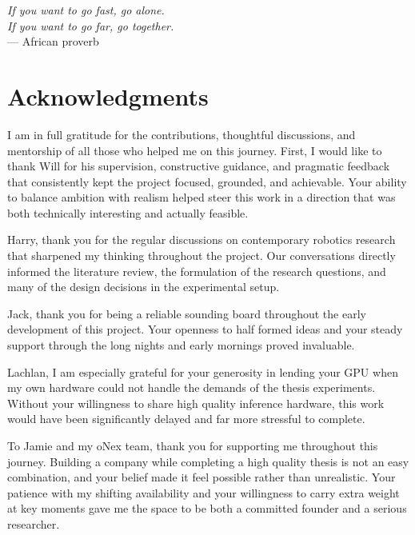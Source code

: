 
\begin{flushright}{\slshape    
    If you want to go fast, go alone. \\
    If you want to go far, go together.} \\ \medskip
    --- African proverb
\end{flushright}

\bigskip

\begingroup
\let\clearpage\relax
\let\cleardoublepage\relax
\chapter*{Acknowledgments}

I am in full gratitude for the contributions, thoughtful discussions, and mentorship of all those who helped me on this journey. First, I would like to thank Will for his supervision, constructive guidance, and pragmatic feedback that consistently kept the project focused, grounded, and achievable. Your ability to balance ambition with realism helped steer this work in a direction that was both technically interesting and actually feasible.

Harry, thank you for the regular discussions on contemporary robotics research that sharpened my thinking throughout the project. Our conversations directly informed the literature review, the formulation of the research questions, and many of the design decisions in the experimental setup.

Jack, thank you for being a reliable sounding board throughout the early development of this project. Your openness to half formed ideas and your steady support through the long nights and early mornings proved invaluable.

Lachlan, I am especially grateful for your generosity in lending your GPU when my own hardware could not handle the demands of the thesis experiments. Without your willingness to share high quality inference hardware, this work would have been significantly delayed and far more stressful to complete.

To Jamie and my oNex team, thank you for supporting me throughout this journey. Building a company while completing a high quality thesis is not an easy combination, and your belief made it feel possible rather than unrealistic. Your patience with my shifting availability and your willingness to carry extra weight at key moments gave me the space to be both a committed founder and a serious researcher.

